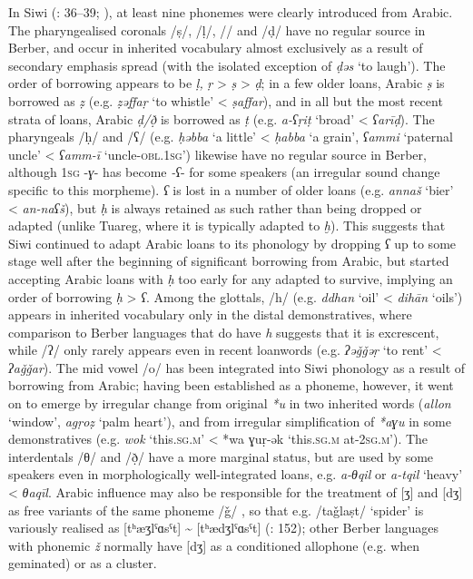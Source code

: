 \documentclass[output=paper]{langsci/langscibook}
\begin{document}
In Siwi (\citealt{Souag2013book}: 36–39; \citealt{SouagvanPutten2016}), at least nine phonemes were clearly introduced from Arabic.  The pharyngealised coronals /ṣ/, /ḷ/, /\R/ and /ḍ/ have no regular source in Berber, and occur in inherited vocabulary almost exclusively as a result of secondary emphasis spread (with the isolated exception of \textit{ḍəs} `to laugh').  The order of borrowing appears to be \textit{ḷ,} \textit{ṛ} > \textit{ṣ} > \textit{ḍ}; in a few older loans, Arabic \textit{ṣ} is borrowed as \textit{ẓ} (e.g. \textit{ẓəffaṛ} `to whistle' < \textit{ṣaffar}), and in all but the most recent strata of loans, Arabic \textit{ḍ/ð̣} is borrowed as \textit{ṭ} (e.g. \textit{a-ʕṛiṭ} `broad' < \textit{ʕarīḍ}).  The pharyngeals /ḥ/ and /ʕ/ (e.g. \textit{ḥəbba} `a little' < \textit{ḥabba} `a grain', \textit{ʕammi} `paternal uncle' < \textit{ʕamm-ī} `uncle-\textsc{obl.1sg}') likewise have no regular source in Berber, although 1\textsc{sg} -\textit{ɣ}{}- has become \textit{{}-ʕ}{}- for some speakers (an irregular sound change specific to this morpheme). \textit{ʕ} is lost in a number of older loans (e.g. \textit{annaš} `bier' < \textit{an-naʕš}), but \textit{ḥ} is always retained as such rather than being dropped or adapted (unlike Tuareg, where it is typically adapted to \textit{ḫ}).  This suggests that Siwi continued to adapt Arabic loans to its phonology by dropping \textit{ʕ} up to some stage well after the beginning of significant borrowing from Arabic, but started accepting Arabic loans with \textit{ḥ} too early for any adapted to survive, implying an order of borrowing \textit{ḥ} > \textit{ʕ}. Among the glottals, /h/ (e.g. \textit{ddhan} `oil' < \textit{dihān} `oils') appears in inherited vocabulary only in the distal demonstratives, where comparison to Berber languages that do have \textit{h} suggests that it is excrescent, while /ʔ/ only rarely appears even in recent loanwords (e.g. \textit{ʔəǧǧəṛ} `to rent' < \textit{ʔaǧǧar}). The mid vowel /o/ has been integrated into Siwi phonology as a result of borrowing from Arabic; having been established as a phoneme, however, it went on to emerge by irregular change from original \textit{*u} in two inherited words (\textit{allon} `window', \textit{agṛoẓ} `palm heart'), and from irregular simplification of \textit{*aɣu} in some demonstratives (e.g. \textit{wok} `this\textsc{.sg.m}' < *wa ɣuṛ-ək `this.\textsc{sg.m} at-\textsc{2sg.m')}. The interdentals /θ/ and /ð̣/ have a more marginal status, but are used by some speakers even in morphologically well-integrated loans, e.g. \textit{a-θqil} or \textit{a-tqil} `heavy' < \textit{θaqīl}. Arabic influence may also be responsible for the treatment of [ʒ] and [dʒ] as free variants of the same phoneme /ǧ/ \citep{Vycichl2005}, so that e.g. /taǧlaṣt/ `spider' is variously realised as [tʰæʒlˤɑsˤt] {\textasciitilde} [tʰædʒlˤɑsˤt] (\citealt{Naumann2012}: 152); other Berber languages with phonemic \textit{ž} normally have [dʒ] as a conditioned allophone (e.g. when geminated) or as a cluster.
\end{document}
